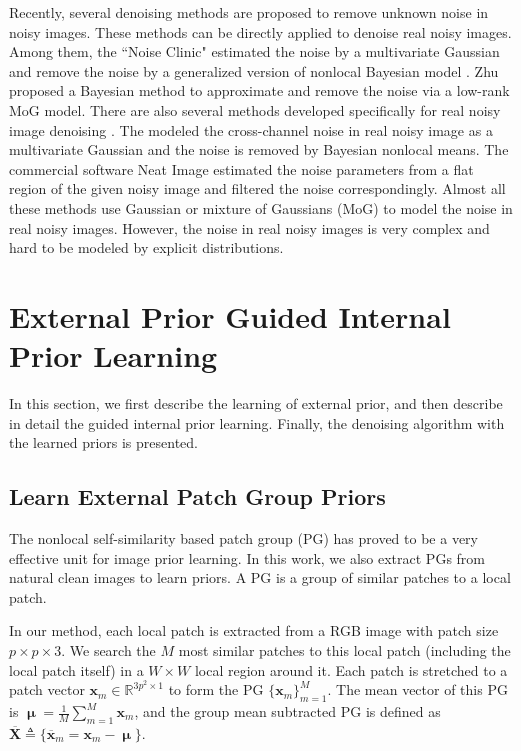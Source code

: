 \documentclass[10pt,twocolumn,letterpaper]{article}
\begin{document}
Recently, several denoising methods \cite{Liu2008,almapg,noiseclinic,ncwebsite,Zhu_2016_CVPR,crosschannel2016} are proposed to remove unknown noise in noisy images. These methods can be directly applied to denoise real noisy images. Among them, the ``Noise Clinic" \cite{noiseclinic,ncwebsite} estimated the noise by a multivariate Gaussian and remove the noise by a generalized version of nonlocal Bayesian model \cite{nlbayes}. Zhu \etal proposed a Bayesian method \cite{Zhu_2016_CVPR} to approximate and remove the noise via a low-rank MoG model. There are also several methods developed specifically for real noisy image denoising \cite{crosschannel2016,neatimage}. The \cite{crosschannel2016} modeled the cross-channel noise in real noisy image as a multivariate Gaussian and the noise is removed by Bayesian nonlocal means. The commercial software Neat Image \cite{neatimage} estimated the noise parameters from a flat region of the given noisy image and filtered the noise correspondingly. Almost all these methods \cite{Liu2008,almapg,noiseclinic,ncwebsite,Zhu_2016_CVPR,crosschannel2016} use Gaussian or mixture of Gaussians (MoG) to model the noise in real noisy images. However, the noise in real noisy images is very complex and hard to be modeled by explicit distributions.

\section{External Prior Guided Internal Prior Learning}

In this section, we first describe the learning of external prior, and then describe in detail the guided internal prior learning. Finally, the denoising algorithm with the learned priors is presented.

\subsection{Learn External Patch Group Priors}

The nonlocal self-similarity based patch group (PG) \cite{pgpd} has proved to be a very effective unit for image prior learning. In this work, we also extract PGs from natural clean images to learn priors. A PG  is a group of similar patches to a local patch. 

In our method, each local patch is extracted from a RGB image with patch size $p\times p \times 3$. We search the $M$ most similar patches to this local patch (including the local patch itself) in a $W\times W$ local region around it. Each patch is stretched to a patch vector $\mathbf{x}_{m}\in \mathbb{R}^{3p^{2}\times1}$ to form the PG $\{\mathbf{x}_{m}\}_{m=1}^{M}$. The mean vector of this PG is $\boldsymbol{\upmu}=\frac{1}{M}\sum_{m=1}^{M}\mathbf{x}_{m}$, and the group mean subtracted PG is defined as $\mathbf{\overline{X}}\triangleq \{\mathbf{\overline{x}}_{m}=\mathbf{x}_{m}-\boldsymbol{\upmu}\}$.
\end{document}
